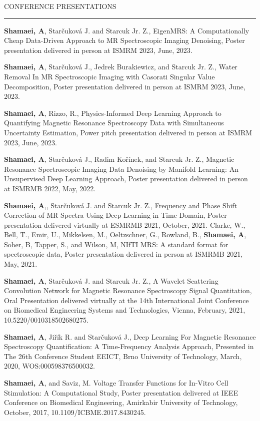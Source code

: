 \documentclass{resume} %
\renewenvironment{rSection}[1]{
\sectionskip
\textcolor{RoyalPurple}{\MakeUppercase{#1}}
\sectionlineskip
\hrule
\begin{list}{}{
\setlength{\leftmargin}{1.5em}
}
\item[]
}{
\end{list}
}
\begin{document}
\begin{rSection}{CONFERENCE PRESENTATIONS}
\begin{rSubsection}{}{}{}{}
\item \textbf{Shamaei, A}, Starčuková J. and Starcuk Jr. Z., EigenMRS: A Computationally Cheap Data-Driven Approach to MR Spectroscopic Imaging Denoising, Poster presentation delivered in person at ISMRM 2023, June, 2023.
\item \textbf{Shamaei, A}, Starčuková J., Jedrek Burakiewicz, and Starcuk Jr. Z., Water Removal In MR Spectroscopic Imaging with Casorati Singular Value Decomposition, Poster presentation delivered in person at ISMRM 2023, June, 2023.
\item \textbf{Shamaei, A}, Rizzo, R., Physics-Informed Deep Learning Approach to Quantifying Magnetic Resonance Spectroscopy Data with Simultaneous Uncertainty Estimation, Power pitch presentation delivered in person at ISMRM 2023, June, 2023.
\item \textbf{Shamaei, A}, Starčuková J., Radim Kořínek, and Starcuk Jr. Z., Magnetic Resonance Spectroscopic Imaging Data Denoising by Manifold Learning: An Unsupervised Deep Learning Approach, Poster presentation delivered in person at ISMRMB 2022, May, 2022.
\item \textbf{Shamaei, A},, Starčuková J. and Starcuk Jr. Z., Frequency and Phase Shift Correction of MR Spectra Using Deep Learning in Time Domain, Poster presentation delivered virtually at ESMRMB 2021, October, 2021.
Clarke, W., Bell, T., Emir, U., Mikkelsen, M., Oeltzschner, G., Rowland, B., \textbf{Shamaei, A}, Soher, B, Tapper, S., and Wilson, M, NIfTI MRS: A standard format for spectroscopic data, Poster presentation delivered in person at ISMRMB 2021, May, 2021.
\item \textbf{Shamaei, A}, Starčuková J. and Starcuk Jr. Z., A Wavelet Scattering Convolution Network for Magnetic Resonance Spectroscopy Signal Quantitation, Oral Presentation delivered virtually at the 14th International Joint Conference on Biomedical Engineering Systems and Technologies, Vienna, February, 2021, 10.5220/0010318502680275.
\item \textbf{Shamaei, A}, Jiřík R. and Starčuková J., Deep Learning For Magnetic Resonance Spectroscopy Quantification: A Time-Frequency Analysis Approach, Presented in The 26th Conference Student EEICT, Brno University of Technology, March, 2020,  WOS:000598376500032.
\item \textbf{Shamaei, A}, and Saviz, M. Voltage Transfer Functions for In-Vitro Cell Stimulation: A Computational Study, Poster presentation delivered at IEEE Conference on Biomedical Engineering, Amirkabir University of Technology, October, 2017, 10.1109/ICBME.2017.8430245.
\end{rSubsection}
\end{rSection}
\end{document}
